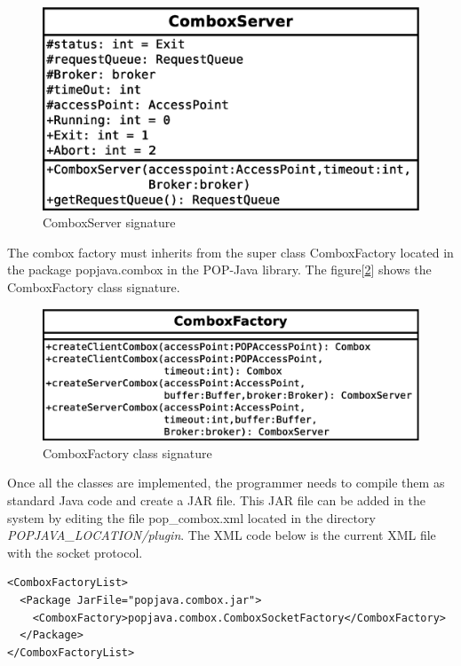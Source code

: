 \begin{figure}[ht]
\caption{ComboxServer signature}
\center
\label{fig:comboxserver_class}
\includegraphics[scale=0.5]{comboxserver.eps}
\end{figure}

The combox factory must inherits from the super class ComboxFactory located in the package popjava.combox in the POP-Java library. The figure[\ref{fig:comboxfactory_class}] shows the ComboxFactory class signature.

\begin{figure}[ht]
\caption{ComboxFactory class signature}
\center
\label{fig:comboxfactory_class}
\includegraphics[scale=0.5]{comboxfactory.eps}
\end{figure}


Once all the classes are implemented, the programmer needs to compile them as standard Java code and create a JAR file. This JAR file can be added in the system by editing the file pop\_combox.xml located in the directory \textit{POPJAVA\_LOCATION/plugin}. The XML code below is the current XML file with the socket protocol.

\begin{lstlisting}
<ComboxFactoryList>
  <Package JarFile="popjava.combox.jar">
    <ComboxFactory>popjava.combox.ComboxSocketFactory</ComboxFactory>
  </Package>
</ComboxFactoryList>
\end{lstlisting}


